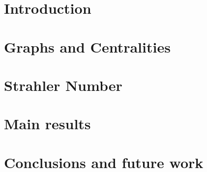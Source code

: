 \documentclass[a4paper,UKenglish]{lipics-v2021}
\begin{document}
	
	\maketitle
	
	
	
	\section{Introduction}\label{sec:introduction}
	
	
	
	\section{Graphs and Centralities}\label{sec:Graphs and Centralities}
	
		\section{Strahler Number}
	\label{sec:Strahler Number}
		

	\section{Main results}\label{sec:results}
	
	
	
	\section{Conclusions and future work}\label{sec:Conclusions and future work}
	
	
	
	
	
	
	\newpage
	\appendix
	
	
\end{document}
